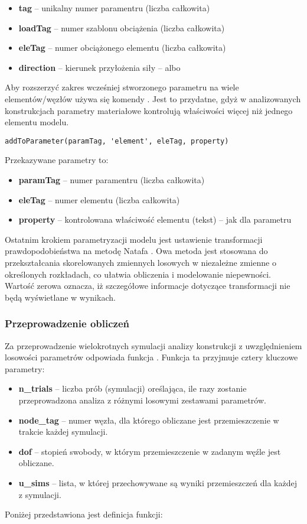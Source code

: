 \begin{itemize}
    \item \textbf{tag} – unikalny numer paramentru (liczba całkowita)
    \item \textbf{loadTag} – numer szablonu obciążenia (liczba całkowita)
    \item \textbf{eleTag} – numer obciążonego elementu (liczba całkowita)
    \item \textbf{direction} – kierunek przyłożenia siły –  albo 
\end{itemize}

Aby rozszerzyć zakres wcześniej stworzonego parametru na wiele elementów/węzłów używa się komendy
. Jest to przydatne, gdyż w analizowanych konstrukcjach
parametry materiałowe kontrolują właściwości więcej niż jednego elementu modelu.

\begin{lstlisting}
addToParameter(paramTag, 'element', eleTag, property)
\end{lstlisting}
Przekazywane parametry to:
\begin{itemize}
    \item \textbf{paramTag} – numer paramentru (liczba całkowita)
    \item \textbf{eleTag} – numer elementu (liczba całkowita)
    \item \textbf{property} – kontrolowana właściwość elementu (tekst) – jak dla parametru
\end{itemize}
Ostatnim krokiem parametryzacji modelu jest ustawienie transformacji prawdopodobieństwa na metodę Natafa .
Owa metoda jest stosowana do przekształcania skorelowanych zmiennych losowych w niezależne zmienne o określonych rozkładach, co ułatwia obliczenia i modelowanie niepewności.
Wartość zerowa oznacza, iż szczegółowe informacje dotyczące transformacji nie będą wyświetlane w wynikach.

\subsubsection{Przeprowadzenie obliczeń}

Za przeprowadzenie wielokrotnych symulacji analizy konstrukcji z uwzględnieniem losowości parametrów odpowiada funkcja . Funkcja ta przyjmuje cztery kluczowe parametry:

\begin{itemize}
    \item \textbf{n\_trials} – liczba prób (symulacji) oreślająca, ile razy zostanie przeprowadzona analiza z różnymi losowymi zestawami parametrów.
    \item \textbf{node\_tag} – numer węzła, dla którego obliczane jest przemieszczenie w trakcie każdej symulacji.
    \item \textbf{dof} – stopień swobody, w którym przemieszczenie w zadanym węźle jest obliczane.
    \item \textbf{u\_sims} – lista, w której przechowywane są wyniki przemieszczeń dla każdej z symulacji.
\end{itemize}
Poniżej przedstawiona jest definicja funkcji:

